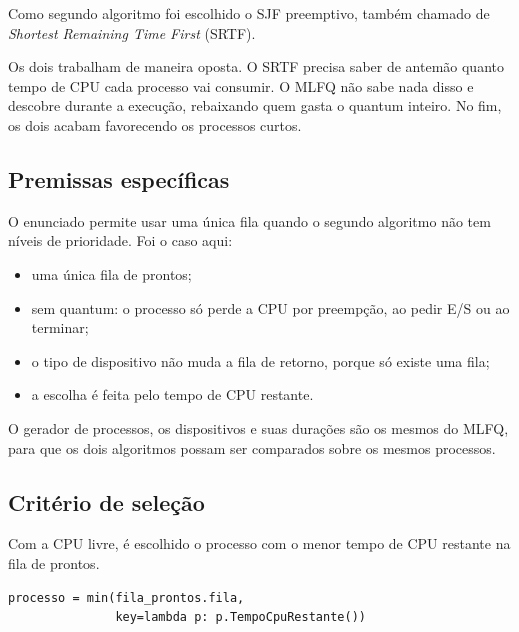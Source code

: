 \documentclass[12pt,a4paper]{article}
\begin{document}
Como segundo algoritmo foi escolhido o SJF preemptivo, também chamado
de \textit{Shortest Remaining Time First} (SRTF).

Os dois trabalham de maneira oposta. O SRTF precisa saber de antemão
quanto tempo de CPU cada processo vai consumir. O MLFQ não sabe nada
disso e descobre durante a execução, rebaixando quem gasta o quantum
inteiro. No fim, os dois acabam favorecendo os processos curtos.



\subsection{Premissas específicas}

O enunciado permite usar uma única fila quando o segundo algoritmo
não tem níveis de prioridade. Foi o caso aqui:

\begin{itemize}

    \item uma única fila de prontos;

    \item sem quantum: o processo só perde a CPU por preempção, ao
    pedir E/S ou ao terminar;

    \item o tipo de dispositivo não muda a fila de retorno, porque só
    existe uma fila;

    \item a escolha é feita pelo tempo de CPU restante.

\end{itemize}

O gerador de processos, os dispositivos e suas durações são os mesmos
do MLFQ, para que os dois algoritmos possam ser comparados sobre os
mesmos processos.



\subsection{Critério de seleção}

Com a CPU livre, é escolhido o processo com o menor tempo de CPU
restante na fila de prontos.

\begin{lstlisting}
processo = min(fila_prontos.fila,
               key=lambda p: p.TempoCpuRestante())
\end{lstlisting}
\end{document}
